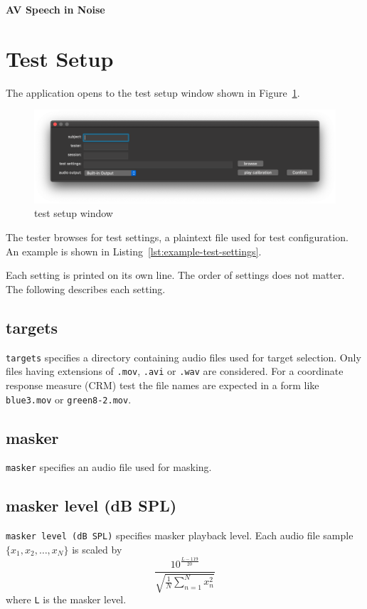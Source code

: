 \documentclass[11pt,pdftex,letterpaper]{article}
\begin{document}
\vspace*{30ex}
\begin{center}
\textbf{AV Speech in Noise}
\end{center}
\pagebreak
\tableofcontents
\pagebreak

\section{Test Setup}
The application opens to the test setup window shown in Figure~\ref{fig:test-setup-window}.
\begin{figure}
	\centering
	\includegraphics[width = 0.9\linewidth]{test-setup-window.png}
	\caption{test setup window}
	\label{fig:test-setup-window}
\end{figure}
The tester browses for test settings, a plaintext file used for test configuration. An example is shown in Listing~\ref{lst:example-test-settings}.

\noindent\begin{minipage}{\textwidth}
	
\end{minipage}
Each setting is printed on its own line. The order of settings does not matter. The following describes each setting.
\subsection{targets}
\texttt{targets} specifies a directory containing audio files used for target selection. Only files having extensions of \texttt{.mov}, \texttt{.avi} or \texttt{.wav} are considered. For a coordinate response measure (CRM) test the file names are expected in a form like \texttt{blue3.mov} or \texttt{green8-2.mov}.
\subsection{masker}
\texttt{masker} specifies an audio file used for masking.
\subsection{masker level (dB SPL)}
\texttt{masker level (dB SPL)} specifies masker playback level. Each audio file sample ${\displaystyle \{x_{1}, x_{2}, \dots , x_{N}\}}$ is scaled by
\begin{equation}
 \frac{10^{\frac{L-119}{20}}}{\sqrt{\frac{1}{N}\sum_{n=1}^{N}x_{n}^{2}}}\label{eq:masker-scale}
\end{equation}
where \texttt{L} is the masker level.
\end{document}
